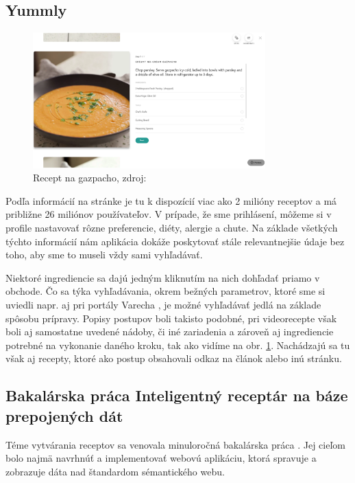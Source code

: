 \subsection{Yummly}

\begin{figure}[h]
\centering
\includegraphics[width=0.8\textwidth]{images/yummly}
\caption{Recept na gazpacho, zdroj: \cite{yummly}}
\label{yummly}
\end{figure}

Podľa informácií na stránke \cite{yummly} je tu k dispozícií viac ako 2 milióny receptov a má
približne 26 miliónov používateľov. V prípade, že sme prihlásení, môžeme si v profile
nastavovať rôzne preferencie, diéty, alergie a chute. Na základe všetkých týchto informácií nám aplikácia dokáže poskytovať stále relevantnejšie údaje bez toho, aby sme to
museli vždy sami vyhľadávať.

Niektoré ingrediencie sa dajú jedným kliknutím na nich dohľadať priamo v obchode.
Čo sa týka vyhľadávania, okrem bežných parametrov, ktoré sme si uviedli napr. aj pri
portály Varecha \cite{varecha}, je možné vyhľadávať jedlá na základe spôsobu prípravy. Popisy
postupov boli takisto podobné, pri videorecepte však boli aj samostatne uvedené nádoby, či iné zariadenia a zároveň aj ingrediencie potrebné na vykonanie daného kroku,
tak ako vidíme na obr. \ref{yummly}. Nachádzajú sa tu však aj recepty, ktoré ako postup
obsahovali odkaz na článok alebo inú stránku.


\subsection{Bakalárska práca Inteligentný receptár na báze prepojených dát}
Téme vytvárania receptov sa venovala minuloročná bakalárska práca \cite{bakalarka}. Jej cieľom
bolo najmä navrhnúť a implementovať webovú aplikáciu, ktorá spravuje a zobrazuje
dáta nad štandardom sémantického webu.

